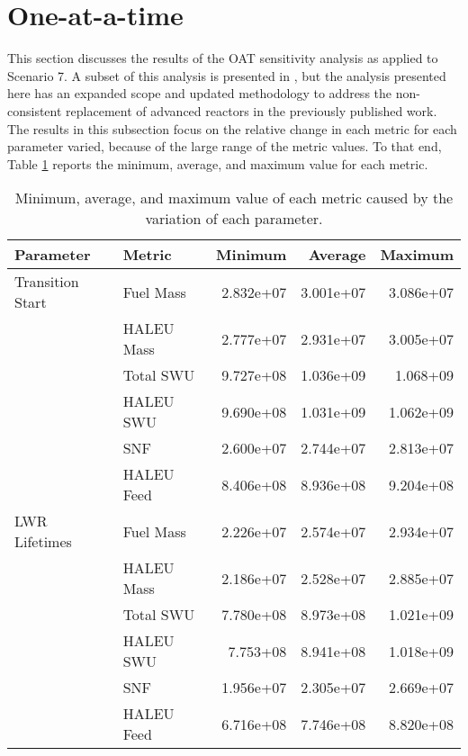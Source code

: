 \section{One-at-a-time}\label{sec:ot_oat}
This section discusses the results of the \gls{OAT} sensitivity analysis 
as applied to Scenario 7. A subset of this analysis is presented 
in \cite{bachmann_sensitivity_2022}, but the analysis presented here has 
an expanded scope and updated methodology to address the non-consistent 
replacement of advanced reactors in the previously published work.
The results in this subsection focus on 
the relative change in each metric for each parameter varied, because 
of the large range of the metric values. To that end, Table 
\ref{tab:oat_values} reports the minimum, 
average, and maximum value for each metric.

\begin{table}[ht!]
    \centering
    \caption{Minimum, average, and maximum value of each metric caused 
    by the variation of each parameter.}
    \label{tab:oat_values}
    \begin{tabular}{llrrr}       
        \hline 
        Parameter &     Metric &      Minimum &      Average &      Maximum \\\hline
        Transition Start &  Fuel Mass & 2.832e+07 & 3.001e+07 & 3.086e+07 \\
                         & HALEU Mass & 2.777e+07 & 2.931e+07 & 3.005e+07 \\ 
                         &  Total SWU & 9.727e+08 & 1.036e+09 & 1.068+09 \\ 
                         & HALEU SWU & 9.690e+08 & 1.031e+09 & 1.062e+09 \\
                         &        SNF & 2.600e+07 & 2.744e+07 & 2.813e+07 \\  
                         & HALEU Feed & 8.406e+08 & 8.936e+08 & 9.204e+08 \\\hline
        LWR Lifetimes &  Fuel Mass & 2.226e+07 & 2.574e+07 & 2.934e+07 \\
                      & HALEU Mass & 2.186e+07 & 2.528e+07 & 2.885e+07 \\
                      &  Total SWU & 7.780e+08 & 8.973e+08 & 1.021e+09 \\
                      &  HALEU SWU & 7.753+08 & 8.941e+08 & 1.018e+09 \\
                      &        SNF & 1.956e+07 & 2.305e+07 & 2.669e+07 \\
                      & HALEU Feed & 6.716e+08 & 7.746e+08 & 8.820e+08 \\\hline 

\end{tabular}
\end{table}
